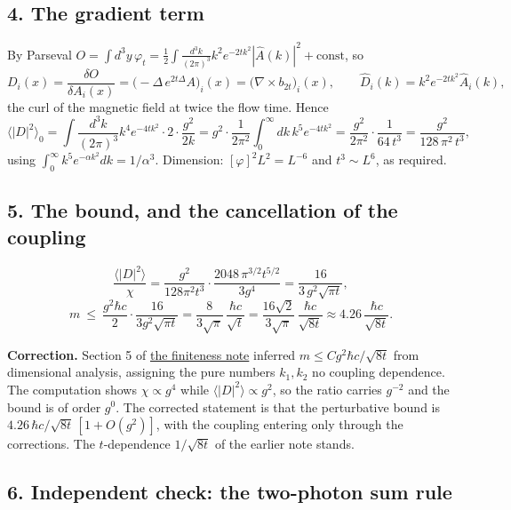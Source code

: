 \documentclass[11pt,a4paper]{article}
\begin{document}
\hypertarget{the-gradient-term}{%
\subsection{4. The gradient term}\label{the-gradient-term}}

By Parseval
\(O=\int d^3y\,\varphi_t=\tfrac12\int\frac{d^3k}{(2\pi)^3}k^2e^{-2tk^2}|\hat A(k)|^2+\text{const}\),
so
\[D_i(x)=\frac{\delta O}{\delta A_i(x)}=\big(-\Delta\,e^{2t\Delta}A\big)_i(x)
=\big(\nabla\times b_{2t}\big)_i(x),\qquad
\hat D_i(k)=k^2e^{-2tk^2}\hat A_i(k),\] the curl of the magnetic field
at twice the flow time. Hence
\[\big\langle|D|^2\big\rangle_0=\int\frac{d^3k}{(2\pi)^3}k^4e^{-4tk^2}\cdot2\cdot\frac{g^2}{2k}
=g^2\cdot\frac1{2\pi^2}\int_0^\infty\!dk\,k^5e^{-4tk^2}
=\frac{g^2}{2\pi^2}\cdot\frac1{64\,t^3}=\frac{g^2}{128\,\pi^2\,t^3},\]
using \(\int_0^\infty k^5e^{-\alpha k^2}dk=1/\alpha^3\). Dimension:
\([\varphi]^2L^2=L^{-6}\) and \(t^3\sim L^6\), as required.

\hypertarget{the-bound-and-the-cancellation-of-the-coupling}{%
\subsection{5. The bound, and the cancellation of the
coupling}\label{the-bound-and-the-cancellation-of-the-coupling}}

\[\frac{\langle|D|^2\rangle}{\chi}
=\frac{g^2}{128\pi^2t^3}\cdot\frac{2048\,\pi^{3/2}t^{5/2}}{3g^4}
=\frac{16}{3\,g^2\sqrt{\pi t}},\]
\[m\ \le\ \frac{g^2\hbar c}{2}\cdot\frac{16}{3g^2\sqrt{\pi t}}
=\frac{8}{3\sqrt\pi}\,\frac{\hbar c}{\sqrt t}
=\frac{16\sqrt2}{3\sqrt\pi}\,\frac{\hbar c}{\sqrt{8t}}\approx4.26\,\frac{\hbar c}{\sqrt{8t}} .\]

\textbf{Correction.} Section 5 of
\href{finiteness-half-flowed-susceptibility.md}{the finiteness note}
inferred \(m\le Cg^2\hbar c/\sqrt{8t}\) from dimensional analysis,
assigning the pure numbers \(k_1,k_2\) no coupling dependence. The
computation shows \(\chi\propto g^4\) while
\(\langle|D|^2\rangle\propto g^2\), so the ratio carries \(g^{-2}\) and
the bound is of order \(g^0\). The corrected statement is that the
perturbative bound is \(4.26\,\hbar c/\sqrt{8t}\,[1+O(g^2)]\), with the
coupling entering only through the corrections. The \(t\)-dependence
\(1/\sqrt{8t}\) of the earlier note stands.

\hypertarget{independent-check-the-two-photon-sum-rule}{%
\subsection{6. Independent check: the two-photon sum
rule}\label{independent-check-the-two-photon-sum-rule}}
\end{document}
